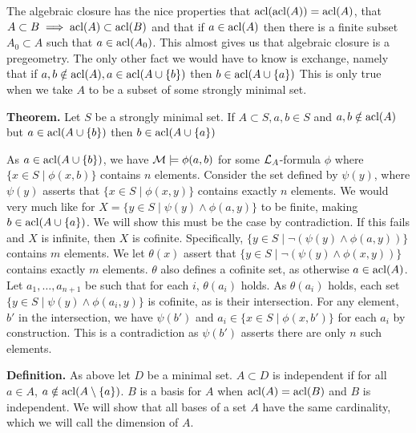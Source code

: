 The algebraic closure has the nice properties that \(\text{acl}(\text{acl}(A)) = \text{acl}(A)\), that \(A \subset B \implies \text{acl}(A) \subset \text{acl}(B)\) and that if \(a \in \text{acl}(A)\) then there is a finite subset \(A_0 \subset A\) such that \(a \in \text{acl}(A_0)\).
This almost gives us that algebraic closure is a pregeometry. %
The only other fact we would have to know is exchange, namely that if \(a, b \notin \text{acl}(A), a \in \text{acl}(A \cup \{b\})\) then \(b \in \text{acl}(A \cup \{a\})\) 
This is only true when we take \(A\) to be a subset of some strongly minimal set.

\textbf{Theorem.} Let \(S\) be a strongly minimal set. If \(A \subset S, a, b \in S\) and \(a, b \notin \text{acl}(A)\) but \(a \in \text{acl}(A \cup \{b\})\) then \(b \in \text{acl}(A \cup \{a\})\) 


As \(a \in \text{acl}(A \cup \{b\})\), we have \(\mathcal{M} \models \phi(a, b)\) for some \(\mathcal{L}_A\)-formula 
\(\phi\) where \(\{x \in S \mid \phi(x, b)\}\) contains \(n\) elements. 
Consider the set defined by \(\psi(y)\), where \(\psi(y)\) asserts that \(\{x \in S \mid \phi(x, y)\}\) contains exactly \(n\) elements. %
We would very much like for \(X = \{y \in S \mid \psi(y) \land \phi(a, y)\}\) to be finite, making \(b \in \text{acl}(A \cup \{a\})\). 
We will show this must be the case by contradiction.
If this fails and \(X\) is infinite, then \(X\) is cofinite. 
Specifically, \(\{y \in S \mid \neg(\psi(y) \land \phi(a, y))\}\) contains \(m\) elements.  
We let \(\theta(x)\) assert that \(\{y \in S \mid \neg(\psi(y) \land \phi(x, y))\}\) contains exactly \(m\) elements.
\(\theta\) also defines a cofinite set, as otherwise \(a \in \text{acl}(A)\).   
Let \(a_1, \ldots, a_{n+1}\) be such that for each \(i\), \(\theta(a_i)\) holds.
As \(\theta(a_i)\) holds, each set \(\{y \in S \mid \psi(y) \land \phi(a_i, y)\}\) is cofinite, as is their intersection. 
For any element, \(b'\) in the intersection, we have \(\psi(b')\) and \(a_i \in \{x \in S \mid \phi(x, b')\}\) for each \(a_i\) by construction.
This is a contradiction as \(\psi(b')\) asserts there are only \(n\) such elements.  

\textbf{Definition.} As above let \(D\) be a minimal set. \(A \subset D\) is independent if for all \(a \in A\), \(a \notin \text{acl}(A \setminus \{a\})\). 
\(B\) is a basis for \(A\) when \(\text{acl}(A) = \text{acl}(B)\) and \(B\) is independent.
We will show that all bases of a set \(A\)  have the same cardinality, which we will call the dimension of \(A\).

